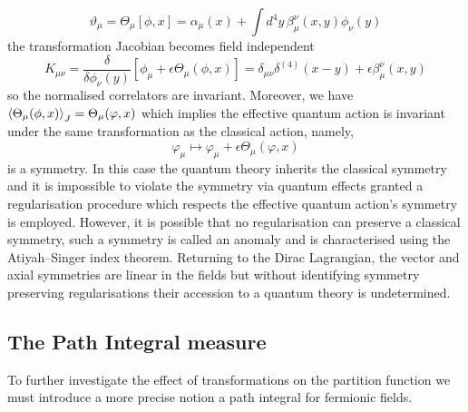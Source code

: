 \documentclass[11pt, a4paper]{article}
\theoremstyle{definition}
\theoremstyle{plain}
\begin{document}
\begin{equation}
  \vartheta_\mu = \Theta_\mu[\phi, x] = \alpha_\mu(x) +
  \int{d^4y\,\beta^\nu_\mu(x, y)\phi_\nu(y) }
\end{equation}
the transformation Jacobian becomes field independent
\begin{equation}
  K_{\mu\nu} = \frac{\delta}{\delta\phi_\nu(y)}[\phi_\mu +\epsilon\Theta_\mu(\phi, x)]
  = \delta_{\mu\nu}\delta^{(4)}(x - y) + \epsilon\beta^\nu_\mu(x, y)
\end{equation}
so the normalised correlators are invariant. Moreover, we have
$\braket{\Theta_\mu(\phi, x)}_J = \Theta_\mu(\varphi, x)$ which implies
the effective quantum action is invariant under the same transformation as the 
classical action, namely,
\begin{equation}
  \varphi_\mu \mapsto \varphi_\mu + \epsilon\Theta_\mu(\varphi, x)
\end{equation}
is a symmetry. In this case the quantum theory inherits the classical symmetry
and it is impossible to violate the symmetry via quantum effects granted
a regularisation procedure which respects the effective quantum
action's symmetry is employed. However, it is possible that no regularisation
can preserve a classical symmetry, such a symmetry is called an anomaly and
is characterised using the Atiyah–Singer index theorem.
Returning to the Dirac Lagrangian, the vector and axial symmetries are linear
in the fields but without identifying symmetry preserving regularisations 
their accession to a quantum theory is undetermined.

\subsection{The Path Integral measure}

To further investigate the effect of transformations on the partition function
we must introduce a more precise notion a path integral for fermionic fields.
\end{document}

